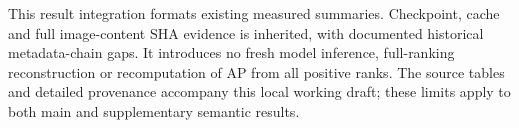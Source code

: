 This result integration formats existing measured summaries. Checkpoint,
cache and full image-content SHA evidence is inherited, with documented
historical metadata-chain gaps. It introduces no fresh model inference,
full-ranking reconstruction or recomputation of AP from all positive ranks.
The source tables and detailed provenance accompany this local working
draft; these limits apply to both main and supplementary semantic results.
